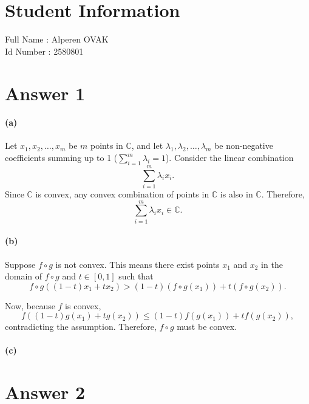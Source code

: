 \documentclass[12pt]{article}
\begin{document}
\section*{Student Information } 
Full Name :  Alperen OVAK\\
Id Number :  2580801\\

\section*{Answer 1}

\paragraph{(a)}
Let \(x_1, x_2, \ldots, x_m\) be \(m\) points in \(\mathbb{C}\), and let \(\lambda_1, \lambda_2, \ldots, \lambda_m\) be non-negative coefficients summing up to 1 (\(\sum_{i=1}^{m} \lambda_i = 1\)). Consider the linear combination
\[
\sum_{i=1}^{m} \lambda_i x_i.
\]
Since \(\mathbb{C}\) is convex, any convex combination of points in \(\mathbb{C}\) is also in \(\mathbb{C}\). Therefore,
\[
\sum_{i=1}^{m} \lambda_i x_i \in \mathbb{C}.
\]

\paragraph{(b)}
Suppose \(f \circ g\) is not convex. This means there exist points \(x_1\) and \(x_2\) in the domain of \(f \circ g\) and \(t \in [0, 1]\) such that
\[
f \circ g\left((1 - t)x_1 + t x_2\right) > (1 - t) \left(f \circ g(x_1)\right) + t \left(f \circ g(x_2)\right).
\]

Now, because \(f\) is convex,
\[
f\left((1 - t)g(x_1) + tg(x_2)\right) \leq (1 - t)f(g(x_1)) + tf(g(x_2)),
\]
contradicting the assumption. Therefore, \(f \circ g\) must be convex.

\paragraph{(c)}


\section*{Answer 2}
\end{document}
